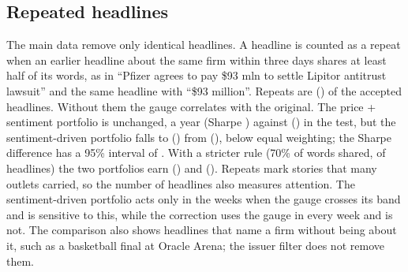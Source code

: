 \subsection{Repeated headlines}
The main data remove only identical headlines. A headline is counted as a repeat when an earlier headline about the same firm within three days shares at least half of its words, as in ``Pfizer agrees to pay \$93 mln to settle Lipitor antitrust lawsuit'' and the same headline with ``\$93 million''. Repeats are \RepShare{} (\RepCount{}) of the accepted headlines. Without them the gauge correlates \RepGaugeCorr{} with the original. The price + sentiment portfolio is unchanged, \RepCombCAGR{} a year (Sharpe \RepCombSharpe{}) against \CombinedCAGR{} (\CombinedSharpe{}) in the test, but the sentiment-driven portfolio falls to \RepSentCAGR{} (\RepSentSharpe{}) from \SentimentCAGR{} (\SentimentSharpe{}), below equal weighting; the Sharpe difference has a 95\% interval of \RepSentCI{}. With a stricter rule (70\% of words shared, \RepShareStrict{} of headlines) the two portfolios earn \RepCombCAGRStrict{} (\RepCombSharpeStrict{}) and \RepSentCAGRStrict{} (\RepSentSharpeStrict{}). Repeats mark stories that many outlets carried, so the number of headlines also measures attention. The sentiment-driven portfolio acts only in the weeks when the gauge crosses its band and is sensitive to this, while the correction uses the gauge in every week and is not. The comparison also shows headlines that name a firm without being about it, such as a basketball final at Oracle Arena; the issuer filter does not remove them.

